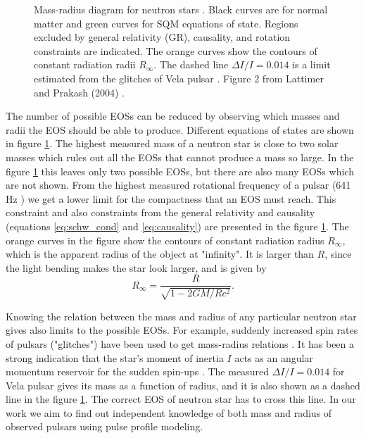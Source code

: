 \documentclass{wihuri}
\def\be{\begin{equation}}
\def\ee{\end{equation}}
\begin{document}
\begin{figure}
\centerline{} 
\caption{Mass-radius diagram for neutron stars \cite{lattimer}. Black curves are for normal matter and green curves for SQM equations of state. Regions excluded by general relativity (GR), causality, and rotation constraints are indicated. The orange curves show the contours of constant radiation radii $R_{\infty}$. The dashed line $\Delta I / I = 0.014$ is a limit estimated from the glitches of Vela pulsar \cite{lattimer2001}. Figure 2 from Lattimer and Prakash (2004) \cite{lattimer}.}  
\label{fig:eos_mr}
\end{figure}

The number of possible EOSs can be reduced by observing which masses and radii the EOS should be able to produce. Different equations of states are shown in figure \ref{fig:eos_mr}. The highest measured mass of a neutron star is close to two solar masses \cite{demorest} which rules out all the EOSs that cannot produce a mass so large. In the figure \ref{fig:eos_mr} this leaves only two possible EOSs, but there are also many EOSs which are not shown. From the highest measured rotational frequency of a pulsar (641 Hz \cite{lattimer}) we get a lower limit for the compactness that an EOS must reach. This constraint and also constraints from the general relativity and causality (equations \ref{eq:schw_cond} and \ref{eq:causality}) are presented in the figure \ref{fig:eos_mr}. The orange curves in the figure show the contours of constant radiation radius $R_{\infty}$, which is the apparent radius of the object at "infinity". It is larger than $R$, since the light bending makes the star look larger, and is given by \cite{lattimer2001}
\be \label{eq:rinfty}
R_{\infty} = \frac{R}{\sqrt{1-2GM/Rc^{2}}}.
\ee  

Knowing the relation between the mass and radius of any particular neutron star gives also limits to the possible EOSs. For example, suddenly increased spin rates of pulsars ("glitches") have been used to get mass-radius relations \cite{lattimer2001}. It has been a strong indication that the star's moment of inertia $I$ acts as an angular momentum reservoir for the sudden spin-ups \cite{link1999}. The measured $\Delta I / I = 0.014$  for Vela pulsar gives its mass as a function of radius, and it is also shown as a dashed line in the figure \ref{fig:eos_mr}. The correct EOS of neutron star has to cross this line. In our work we aim to find out independent knowledge %
of both mass and radius of observed pulsars using pulse profile modeling. 
\end{document}
